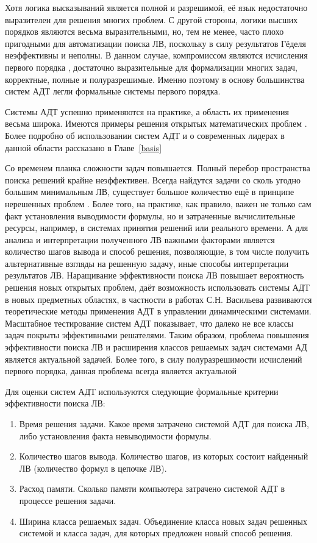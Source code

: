 Хотя логика высказываний является полной и разрешимой, её язык недостаточно выразителен для решения многих проблем. С другой стороны, логики высших порядков являются весьма выразительными, но, тем не менее, часто плохо пригодными для автоматизации поиска ЛВ, поскольку в силу результатов Гёделя неэффективны и неполны. В данном случае, компромиссом являются исчисления первого порядка \cite{Frege, Sourcebook, mendelson}, достаточно выразительные для формализации многих задач, корректные, полные и полуразрешимые. Именно поэтому в основу большинства систем АДТ легли формальные системы первого порядка.

Системы АДТ успешно применяются на практике, а область их применения весьма широка. Имеются примеры решения открытых математических проблем \cite{McCuneRob}. Более подробно об использовании систем АДТ и о современных лидерах в данной области рассказано в Главе~\ref{basis}

Со временем планка сложности задач повышается. Полный перебор пространства поиска решений крайне неэффективен. Всегда найдутся задачи со сколь угодно большим минимальным ЛВ, существует большое количество ещё в принципе нерешенных проблем \cite{tptp}. Более того, на практике, как правило, важен не только сам факт установления выводимости формулы, но и затраченные вычислительные ресурсы, например, в системах принятия решений или реального времени. А для анализа и интерпретации полученного ЛВ важными факторами является количество шагов вывода и способ решения, позволяющие, в том числе получить альтернативные взгляды на решенную задачу, иные способы интерпретации результатов ЛВ. Наращивание эффективности поиска ЛВ повышает вероятность решения новых открытых проблем, даёт возможность использовать системы АДТ в новых предметных областях, в частности в работах С.Н. Васильева \cite{ICDS2000} развиваются теоретические методы применения АДТ в управлении динамическими системами. Масштабное тестирование систем АДТ \cite{tptp} показывает, что далеко не все классы задач покрыты эффективными решателями. Таким образом, проблема повышения эффективности поиска ЛВ и расширения классов решаемых задач системами АД является актуальной задачей. Более того, в силу полуразрешимости исчислений первого порядка, данная проблема всегда является актуальной

Для оценки систем АДТ используются следующие формальные критерии эффективности поиска ЛВ:
\label{pg:criterion}
\begin{enumerate}
\item{Время решения задачи.} Какое время затрачено системой АДТ для поиска ЛВ, либо установления факта невыводимости формулы.
\item{Количество шагов вывода.} Количество шагов, из которых состоит найденный ЛВ (количество формул в цепочке ЛВ).
\item{Расход памяти.} Сколько памяти компьютера затрачено системой АДТ в процессе решения задачи.
\item{Ширина класса решаемых задач.} Объединение класса новых задач решенных системой и класса задач, для которых предложен новый способ решения.
\end{enumerate}

